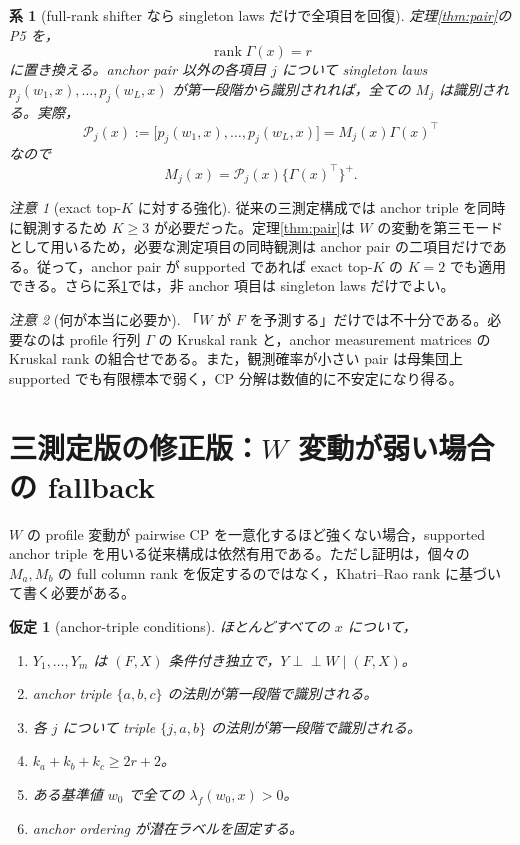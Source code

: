 \documentclass[11pt,a4paper]{ltjsarticle}
\newtheorem{assumption}{仮定}[section]
\newtheorem{corollary}{系}[section]
\theoremstyle{remark}\newtheorem{remark}{注意}[section]
\newcommand{\ind}{\perp\!\!\!\perp}
\newcommand{\rank}{\operatorname{rank}}
\begin{document}
\begin{corollary}[full-rank shifter なら singleton laws だけで全項目を回復]\label{cor:singleton}
定理\ref{thm:pair}の P5 を，
\[
\rank\Gamma(x)=r
\]
に置き換える。anchor pair 以外の各項目 $j$ について singleton laws $p_j(w_1,x),\ldots,p_j(w_L,x)$ が第一段階から識別されれば，全ての $M_j$ は識別される。実際，
\begin{equation}
\mathcal P_j(x):=
\big[p_j(w_1,x),\ldots,p_j(w_L,x)\big]
=M_j(x)\Gamma(x)^\top
\end{equation}
なので
\begin{equation}
M_j(x)=\mathcal P_j(x)\{\Gamma(x)^\top\}^+.
\label{eq:singleton-recover}
\end{equation}
\end{corollary}

\begin{remark}[exact top-$K$ に対する強化]
従来の三測定構成では anchor triple を同時に観測するため $K\ge3$ が必要だった。定理\ref{thm:pair}は $W$ の変動を第三モードとして用いるため，必要な測定項目の同時観測は anchor pair の二項目だけである。従って，anchor pair が supported であれば exact top-$K$ の $K=2$ でも適用できる。さらに系\ref{cor:singleton}では，非 anchor 項目は singleton laws だけでよい。
\end{remark}

\begin{remark}[何が本当に必要か]
「$W$ が $F$ を予測する」だけでは不十分である。必要なのは profile 行列 $\Gamma$ の Kruskal rank と，anchor measurement matrices の Kruskal rank の組合せである。また，観測確率が小さい pair は母集団上 supported でも有限標本で弱く，CP 分解は数値的に不安定になり得る。
\end{remark}

\section{三測定版の修正版：$W$ 変動が弱い場合の fallback}

$W$ の profile 変動が pairwise CP を一意化するほど強くない場合，supported anchor triple を用いる従来構成は依然有用である。ただし証明は，個々の $M_a,M_b$ の full column rank を仮定するのではなく，Khatri--Rao rank に基づいて書く必要がある。

\begin{assumption}[anchor-triple conditions]\label{as:triple}
ほとんどすべての $x$ について，
\begin{enumerate}[label=(T\arabic*)]
\item $Y_1,\ldots,Y_m$ は $(F,X)$ 条件付き独立で，$Y\ind W\mid(F,X)$。
\item anchor triple $\{a,b,c\}$ の法則が第一段階で識別される。
\item 各 $j$ について triple $\{j,a,b\}$ の法則が第一段階で識別される。
\item $k_a+k_b+k_c\ge2r+2$。
\item ある基準値 $w_0$ で全ての $\lambda_f(w_0,x)>0$。
\item anchor ordering が潜在ラベルを固定する。
\end{enumerate}
\end{assumption}
\end{document}
